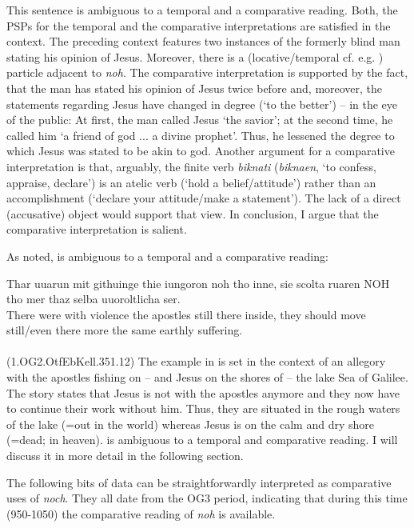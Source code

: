 \documentclass[output=paper
,modfonts
,nonflat]{langsci/langscibook}
\begin{document}
This sentence is ambiguous to a temporal and a comparative reading. Both, the PSPs for the temporal and the comparative interpretations are satisfied in the context. The preceding context features two instances of the formerly blind man stating his opinion of Jesus. Moreover, there is a (locative/temporal cf. e.g. \citep{petrova2011}) particle adjacent to \textit{noh}. The comparative interpretation is supported by the fact, that the man has stated his opinion of Jesus twice before and, moreover, the statements regarding Jesus have changed in degree (`to the better') -- in the eye of the public: At first, the man called Jesus `the savior'; at the second time, he called him `a friend of god ... a divine prophet'. Thus, he lessened the degree to which Jesus was stated to be akin to god. Another argument for a comparative interpretation is that, arguably, the finite verb \textit{biknati} (\textit{biknaen}, `to confess, appraise, declare') is an atelic verb (`hold a belief/attitude') rather than an accomplishment (`declare your attitude/make a statement'). The lack of a direct (accusative) object would support that view. In conclusion, I argue that the comparative interpretation is salient.

As noted,  is ambiguous to a temporal and a comparative reading:

\ea\gll Thar uuarun mit githuinge thie iungoron noh tho inne, sie scolta ruaren NOH tho mer thaz selba uuoroltlicha ser.\\
       There were with violence the apostles still there inside, they should move still/even there more the same earthly suffering.\\
\label{OG2_noch_mehr_ruehren_first} \\  (1.OG2.OtfEbKell.351.12)
\z
The example in  is set in the context of an allegory with the apostles fishing on -- and Jesus on the shores of -- the lake Sea of Galilee. The story states that Jesus is not with the apostles anymore and they now have to continue their work without him. Thus, they are situated in the rough waters of the lake (=out in the world) whereas Jesus is on the calm and dry shore (=dead; in heaven).  is ambiguous to a temporal and comparative reading. I will discuss it in more detail in the following section.

The following bits of data can be straightforwardly interpreted as comparative uses of \textit{noch}. They all date from the OG3 period, indicating that during this time (950-1050) the comparative reading of \textit{noh} is available.
\end{document}

